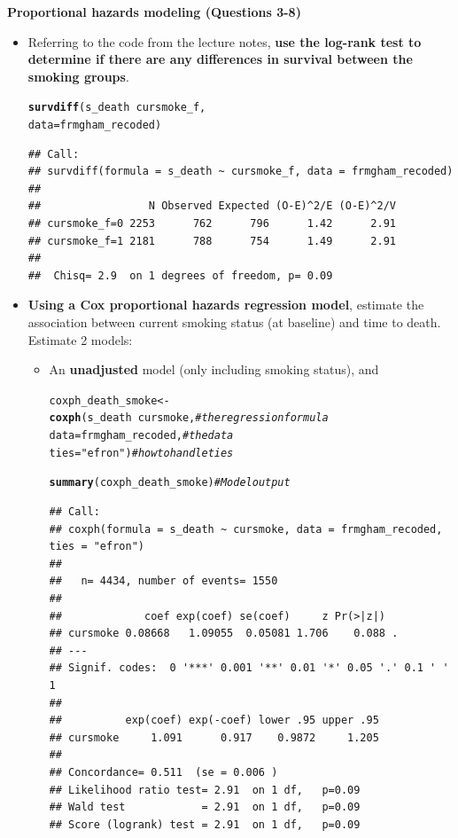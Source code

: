 \documentclass{article}\usepackage[]{graphicx}\usepackage[]{color}
\makeatletter
\newcommand{\hlstr}[1]{\textcolor[rgb]{0.192,0.494,0.8}{#1}}%
\newcommand{\hlcom}[1]{\textcolor[rgb]{0.678,0.584,0.686}{\textit{#1}}}%
\newcommand{\hlopt}[1]{\textcolor[rgb]{0,0,0}{#1}}%
\newcommand{\hlstd}[1]{\textcolor[rgb]{0.345,0.345,0.345}{#1}}%
\newcommand{\hlkwb}[1]{\textcolor[rgb]{0.69,0.353,0.396}{#1}}%
\newcommand{\hlkwc}[1]{\textcolor[rgb]{0.333,0.667,0.333}{#1}}%
\newcommand{\hlkwd}[1]{\textcolor[rgb]{0.737,0.353,0.396}{\textbf{#1}}}%
\newenvironment{kframe}{%
 \def\at@end@of@kframe{}%
 \ifinner\ifhmode%
  \def\at@end@of@kframe{\end{minipage}}%
  \begin{minipage}{\columnwidth}%
 \fi\fi%
 \def\FrameCommand##1{\hskip\@totalleftmargin \hskip-\fboxsep
 \colorbox{shadecolor}{##1}\hskip-\fboxsep
     \hskip-\linewidth \hskip-\@totalleftmargin \hskip\columnwidth}%
 \MakeFramed {\advance\hsize-\width
   \@totalleftmargin\z@ \linewidth\hsize
   \@setminipage}}%
 {\par\unskip\endMakeFramed%
 \at@end@of@kframe}
\newenvironment{knitrout}{}{} %
\makeatother
\begin{document}
\textbf{Proportional hazards modeling (Questions 3-8)}
\begin{itemize}
  \item Referring to the code from the lecture notes, \textbf{use the log-rank test to determine if there are any differences in survival between the smoking groups}.
  

\begin{knitrout}
\color{fgcolor}\begin{kframe}
\begin{alltt}
\hlkwd{survdiff}\hlstd{(s_death} \hlopt{~} \hlstd{cursmoke_f,}
         \hlkwc{data} \hlstd{= frmgham_recoded)}
\end{alltt}
\begin{verbatim}
## Call:
## survdiff(formula = s_death ~ cursmoke_f, data = frmgham_recoded)
## 
##                 N Observed Expected (O-E)^2/E (O-E)^2/V
## cursmoke_f=0 2253      762      796      1.42      2.91
## cursmoke_f=1 2181      788      754      1.49      2.91
## 
##  Chisq= 2.9  on 1 degrees of freedom, p= 0.09
\end{verbatim}
\end{kframe}
\end{knitrout}

  \item \textbf{Using a Cox proportional hazards regression model}, estimate the association between current smoking status (at baseline) and time to death. Estimate 2 models:
  \begin{itemize}
    \item An \textbf{unadjusted} model (only including smoking status), and
    
\begin{knitrout}
\color{fgcolor}\begin{kframe}
\begin{alltt}
\hlstd{coxph_death_smoke} \hlkwb{<-}
  \hlkwd{coxph}\hlstd{(s_death} \hlopt{~} \hlstd{cursmoke,} \hlcom{# the regression formula}
                    \hlkwc{data} \hlstd{= frmgham_recoded,} \hlcom{# the data}
                    \hlkwc{ties} \hlstd{=} \hlstr{"efron"}\hlstd{)} \hlcom{# how to handle ties}

\hlkwd{summary}\hlstd{(coxph_death_smoke)} \hlcom{# Model output}
\end{alltt}
\begin{verbatim}
## Call:
## coxph(formula = s_death ~ cursmoke, data = frmgham_recoded, ties = "efron")
## 
##   n= 4434, number of events= 1550 
## 
##             coef exp(coef) se(coef)     z Pr(>|z|)  
## cursmoke 0.08668   1.09055  0.05081 1.706    0.088 .
## ---
## Signif. codes:  0 '***' 0.001 '**' 0.01 '*' 0.05 '.' 0.1 ' ' 1
## 
##          exp(coef) exp(-coef) lower .95 upper .95
## cursmoke     1.091      0.917    0.9872     1.205
## 
## Concordance= 0.511  (se = 0.006 )
## Likelihood ratio test= 2.91  on 1 df,   p=0.09
## Wald test            = 2.91  on 1 df,   p=0.09
## Score (logrank) test = 2.91  on 1 df,   p=0.09
\end{verbatim}
\end{kframe}
\end{knitrout}
    

\end{itemize}
\end{itemize}
\end{document}
